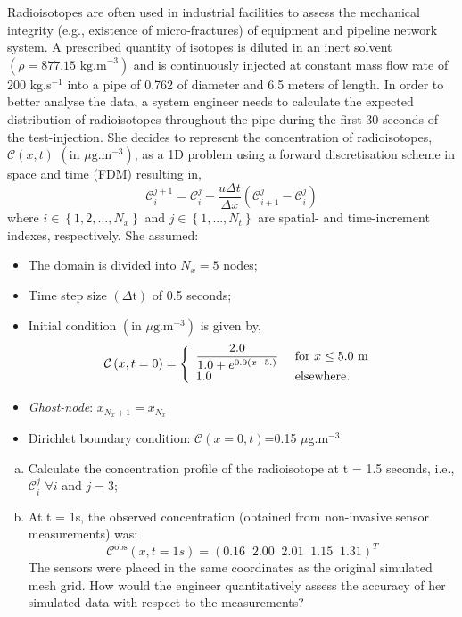 \documentclass[calculator,datasheet]{exam}
\begin{document}
\begin{question} 
Radioisotopes are often used in industrial facilities to assess the mechanical integrity (e.g., existence of micro-fractures) of equipment and pipeline network system. A prescribed quantity of isotopes is diluted in an inert solvent $\left(\rho=\text{877.15 kg.m}^{-3}\right)$ and is continuously injected at constant mass flow rate of 200 kg.s$^{-1}$ into a pipe of 0.762 of diameter and 6.5 meters of length.  In order to better analyse the data, a system engineer needs to calculate the expected distribution of radioisotopes throughout the pipe during the first 30 seconds of the test-injection. She decides to represent the concentration of radioisotopes, $\mathcal{C}\left(x,t\right)$ $\left(\text{in }\mu\text{g.m}^{-3}\right)$, as a 1D problem using a forward discretisation scheme in space and time (FDM) resulting in,
\begin{displaymath}
\mathcal{C}_{i}^{j+1}=\mathcal{C}_{i}^{j} - \frac{u\Delta t}{\Delta x }\left(\mathcal{C}_{i+1}^{j}-\mathcal{C}_{i}^{j}\right)
\end{displaymath}
where $i\in\left\{1,2,...,N_{x}\right\}$ and $j\in\left\{1,...,N_{t}\right\}$ are spatial- and time-increment indexes, respectively. She assumed:
\begin{itemize}
\item The domain is divided into $N_{x}=5$ nodes;
\item Time step size $\left(\Delta\text{t}\right)$ of 0.5 seconds;
\item Initial condition $\left(\text{in }\mu\text{g.m}^{-3}\right)$ is given by,
\[
\mathcal{C}\left(x,t=0\right)=
\left\{\begin{array}{l l}
\displaystyle\frac{2.0}{1.0 + e^{0.9\left(x-5.\right)}}  & \text{ for }  x \le 5.0 \text{ m }\\
1.0 & \text{ elsewhere.}
\end{array}\right.\]
\item {\it Ghost-node}: $x_{N_{x}+1}=x_{N_{x}}$
\item Dirichlet boundary condition: $\mathcal{C}\left(x=0,t\right)$=0.15 $\mu$g.m$^{-3}$
\end{itemize}
\begin{enumerate}[(a)]
\item Calculate the concentration profile of the radioisotope at t = 1.5 seconds, i.e., $\mathcal{C}_{i}^{j}$ $\forall i$ and $j=3$;~ 
\item At t = 1s, the observed concentration (obtained from non-invasive sensor measurements) was:
\begin{displaymath}
\mathcal{C}^{\text{obs}}\left(x,t=1s\right)= \left(0.16 \;\; 2.00 \;\; 2.01 \;\; 1.15 \;\; 1.31\right)^{T}
\end{displaymath}
The sensors were placed in the same coordinates as the original simulated mesh grid. How would the engineer quantitatively assess the accuracy of her simulated data with respect to the measurements?~ 
\end{enumerate}

\end{question}
\end{document}
